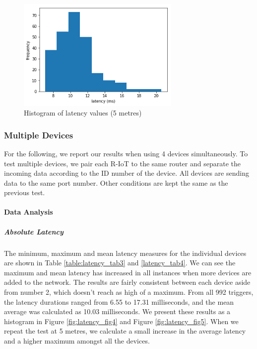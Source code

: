 \begin{figure}[htbp]
  \centering
    \includegraphics[width=0.7\textwidth]{Chapters/Figures/technical/Latency/figure3.png}
    \caption{Histogram of latency values (5 metres)}
    \label{fig:latency_fig3}
\end{figure}

\subsubsection{Multiple Devices}

For the following, we report our results when using 4 devices simultaneously. To test multiple devices, we pair each R-IoT to the same router and separate the incoming data according to the ID number of the device. All devices are sending data to the same port number. Other conditions are kept the same as the previous test.

\paragraph{Data Analysis}

\subparagraph{Absolute Latency}
The minimum, maximum and mean latency measures for the individual devices are shown in Table \ref{table:latency_tab3} and \ref{latency_tab4}. We can see the maximum and mean latency has increased in all instances when more devices are added to the network. The results are fairly consistent between each device aside from number 2, which doesn’t reach as high of a maximum. From all 992 triggers, the latency durations ranged from 6.55 to 17.31 milliseconds, and the mean average was calculated as 10.03 milliseconds. We present these results as a histogram in Figure \ref{fig:latency_fig4} and Figure \ref{fig:latency_fig5}. When we repeat the test at 5 metres, we calculate a small increase in the average latency and a higher maximum amongst all the devices.

